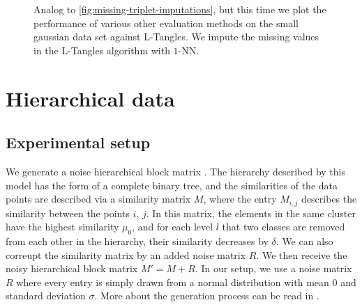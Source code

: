 \begin{figure}[ht]
    \centering
    \resizebox{0.7\textwidth}{!}{}
    \caption{
        Analog to \autoref{fig:missing-triplet-imputations}, but this time we plot the performance of various other evaluation methods on the small gaussian data set against L-Tangles.
        We impute the missing values in the L-Tangles algorithm with $1$-NN.
    }
    \label{fig:missing-triplet-performance}
\end{figure}




\section{Hierarchical data}\label{sec:hierarchical_data}
\subsection{Experimental setup}
We generate a noise hierarchical block matrix \citep{balakrishnanNoiseThresholdsSpectral2011}.
The hierarchy described by this model has the form of a complete binary tree, and the similarities of the data points are described via a similarity matrix $M$, where the entry $M_{i,j}$ describes the similarity
between the points $i$, $j$.
In this matrix, the elements in the same cluster have the highest similarity $\mu_0$, 
and for each level $l$ that two classes are removed
from each other in the hierarchy, their similarity decreases by $\delta$. 
We can also correupt the similarity matrix by 
an added noise matrix $R$. We then receive the noisy hierarchical block matrix $M' = M + R$. 
In our setup, we use a noise matrix $R$ where every entry is simply drawn from a normal distribution with mean $0$ and standard deviation $\sigma$.
More about the generation process can be read in \cite{ghoshdastidarFoundationsComparisonBasedHierarchical2019}.

